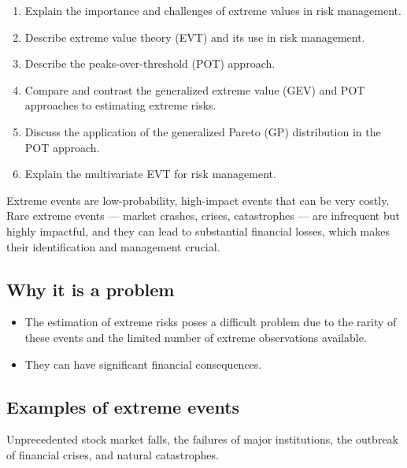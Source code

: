 
\begin{mrkeybox}[title={Learning objectives in this reading}]
\small
\begin{enumerate}[label=\textbf{\alph*.},leftmargin=1.7em]
\item Explain the importance and challenges of extreme values in risk management.
\item Describe extreme value theory (EVT) and its use in risk management.
\item Describe the peaks-over-threshold (POT) approach.
\item Compare and contrast the generalized extreme value (GEV) and POT approaches to estimating
      extreme risks.
\item Discuss the application of the generalized Pareto (GP) distribution in the POT approach.
\item Explain the multivariate EVT for risk management.
\end{enumerate}
\end{mrkeybox}


\begin{mrdefbox}[title={Extreme values}]
Extreme events are low-probability, high-impact events that can be very costly. Rare extreme
events --- market crashes, crises, catastrophes --- are infrequent but highly impactful, and
they can lead to substantial financial losses, which makes their identification and management
crucial.
\end{mrdefbox}

\subsection{Why it is a problem}
\begin{itemize}
\item The estimation of extreme risks poses a difficult problem due to the rarity of these
      events and the limited number of extreme observations available.
\item They can have significant financial consequences.
\end{itemize}

\subsection{Examples of extreme events}
Unprecedented stock market falls, the failures of major institutions, the outbreak of financial
crises, and natural catastrophes.


